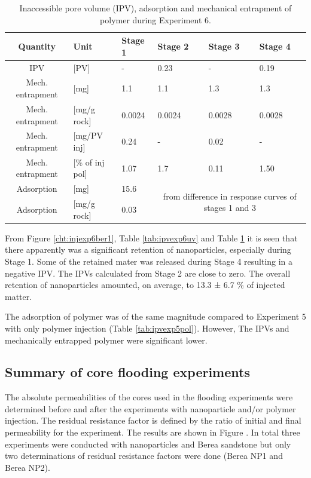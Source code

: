 \begin{table}[p]
\small
\centering
\caption{Inaccessible pore volume (IPV), adsorption and mechanical entrapment of polymer during Experiment 6.}
\label{tab:ipvexp6pol}
\begin{tabular}{c l l l l l } 
\toprule
\textbf{Quantity} & \textbf{Unit} & \textbf{Stage 1} & \textbf{Stage 2} & \textbf{Stage 3} & \textbf{Stage 4} \\ 
\midrule 
IPV                & [PV]           & -         & 0.23     & -         & 0.19     \\
Mech. entrapment   & [mg]          & 1.1       & 1.1      & 1.3       & 1.3       \\ 
Mech. entrapment   & [mg/g rock]   & 0.0024   & 0.0024     & 0.0028     & 0.0028     \\ 
Mech. entrapment   & [mg/PV inj]   & 0.24      & -         & 0.02      & -         \\
Mech. entrapment   & [\% of inj pol]& 1.07       & 1.7       & 0.11       & 1.50       \\ 
Adsorption         & [mg]          & 15.6      &   \multicolumn{3}{c}{\multirow{2}{15em}{from difference in response curves of stages 1 and 3}}        \\
Adsorption         & [mg/g rock]   & 0.03      &  \multicolumn{3}{c}{}    \\ 
\bottomrule
\end{tabular}
\end{table}


From Figure \ref{cht:injexp6ber1},  Table \ref{tab:ipvexp6uv} and Table \ref{tab:ipvexp6pol} it is seen that there apparently was a significant retention of nanoparticles, especially during Stage 1. Some of the retained mater was released during Stage 4 resulting in a negative IPV. The IPVs calculated from Stage 2 are close to zero. The overall retention of nanoparticles amounted, on average, to 13.3 ± 6.7 \% of injected matter.

The adsorption of polymer was of the same magnitude compared to Experiment 5 with only polymer injection (Table \ref{tab:ipvexp5pol}). However, The IPVs and mechanically entrapped polymer were significant lower.

 \subsection{Summary of core flooding experiments}
The absolute permeabilities of the cores used in the flooding experiments were determined before and after the experiments with nanoparticle and/or polymer injection. The residual resistance factor is defined by the ratio of initial and final permeability for the experiment. The results are shown in Figure \what [5.1]. In total three experiments were conducted with nanoparticles and Berea sandstone but only two determinations of residual resistance factors were done (Berea NP1 and Berea NP2).

